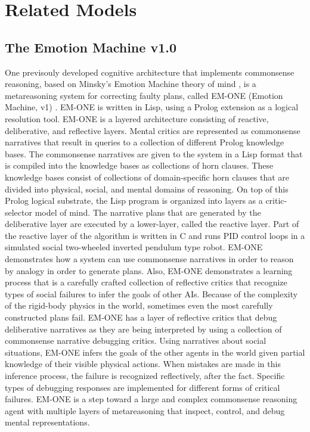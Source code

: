 \chapter{Related Models}
\label{chapter:related_models}

\section{The Emotion Machine v1.0}

One previsouly developed cognitive architecture that implements
commonsense reasoning, based on Minsky's Emotion Machine theory of
mind \cite[]{minsky:2006}, is a metareasoning system for correcting
faulty plans, called EM-ONE (Emotion Machine, v1)
\cite[]{singh:2005b}. EM-ONE is written in Lisp, using a Prolog
extension as a logical resolution tool. EM-ONE is a layered
architecture consisting of reactive, deliberative, and reflective
layers. Mental critics are represented as commonsense narratives that
result in queries to a collection of different Prolog knowledge
bases. The commonsense narratives are given to the system in a Lisp
format that is compiled into the knowledge bases as collections of
horn clauses. These knowledge bases consist of collections of
domain-specific horn clauses that are divided into physical, social,
and mental domains of reasoning. On top of this Prolog logical
substrate, the Lisp program is organized into layers as a
critic-selector model of mind. The narrative plans that are generated
by the deliberative layer are executed by a lower-layer, called the
reactive layer. Part of the reactive layer of the algorithm is written
in C and runs PID control loops in a simulated social two-wheeled
inverted pendulum type robot. EM-ONE demonstrates how a system can use
commonsense narratives in order to reason by analogy in order to
generate plans. Also, EM-ONE demonstrates a learning process that is a
carefully crafted collection of reflective critics that recognize
types of social failures to infer the goals of other AIs.  Because of
the complexity of the rigid-body physics in the world, sometimes even
the most carefully constructed plans fail. EM-ONE has a layer of
reflective critics that debug deliberative narratives as they are
being interpreted by using a collection of commonsense narrative
debugging critics.  Using narratives about social situations, EM-ONE
infers the goals of the other agents in the world given partial
knowledge of their visible physical actions. When mistakes are made in
this inference process, the failure is recognized reflectively, after
the fact. Specific types of debugging responses are implemented for
different forms of critical failures. EM-ONE is a step toward a large
and complex commonsense reasoning agent with multiple layers of
metareasoning that inspect, control, and debug mental representations.

